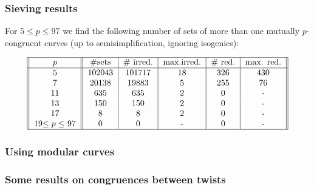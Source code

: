 \documentclass[compress]{beamer}
\begin{document}
\begin{frame}\frametitle{Sieving results}
  For $5\le p\le 97$ we find the following number of sets of more than
  one mutually $p$-congruent curves (up to semisimplification,
  ignoring isogenies):

  \[
  \begin{tabular}{||c||c|c|c|c|c||}
    \hline
    $p$ & \#sets & \# irred. & max.irred. & \# red. & max. red.\\
    \hline
    5 & 102043 & 101717 & 18 & 326 & 430 \\
    7 & 20138 & 19883 & 5 & 255 & 76 \\
    11 & 635 & 635 & 2 & 0 & - \\
    13 & 150 & 150 & 2 & 0 & - \\
    17 & 8 & 8 & 2 & 0 & - \\
    19$\le p\le$ 97 & 0 & 0 & - & 0 & - \\
    \hline
  \end{tabular}
  \]
\end{frame}

\begin{frame}\frametitle{}
\end{frame}

\begin{frame}\frametitle{}
\end{frame}

\begin{frame}\frametitle{}
\end{frame}

\begin{frame}\frametitle{Using modular curves} %
\end{frame}

\begin{frame}\frametitle{Some results on congruences between twists}
\end{frame}
\end{document}
